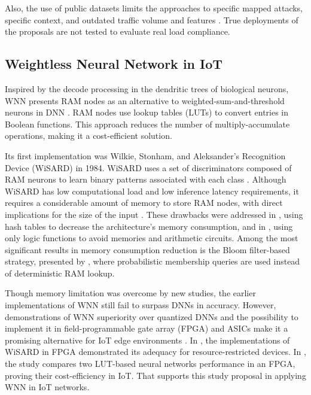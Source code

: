 Also, the use of public datasets limits the approaches to specific mapped attacks, specific context, and outdated traffic volume and features \cite{sharafaldin:2018, di:2021}. True deployments of the proposals are not tested to evaluate real load compliance. 

\subsection{Weightless Neural Network in IoT}
Inspired by the decode processing in the dendritic trees of biological neurons, WNN presents RAM nodes as an alternative to weighted-sum-and-threshold neurons in DNN \cite{aleksander:2009}. RAM nodes use lookup tables (LUTs) to convert entries in Boolean functions. This approach reduces the number of multiply-accumulate operations, making it a cost-efficient solution.

Its first implementation was Wilkie, Stonham, and Aleksander’s Recognition Device (WiSARD) in 1984. WiSARD uses a set of discriminators composed of RAM neurons to learn binary patterns associated with each class \cite{di:2020}. Although WiSARD has low computational load and low inference latency requirements, it requires a considerable amount of memory to store RAM nodes, with direct implications for the size of the input \cite{lello:2020}. These drawbacks were addressed in \cite{ferreira:2019}, using hash tables to decrease the architecture's memory consumption, and in \cite{miranda:2022}, using only logic functions to avoid memories and arithmetic circuits. Among the most significant results in memory consumption reduction is the Bloom filter-based strategy, presented by \cite{santiago:2020, susskind:2022}, where probabilistic membership queries are used instead of deterministic RAM lookup.

Though memory limitation was overcome by new studies, the earlier implementations of WNN still fail to surpass DNNs in accuracy. However, demonstrations of WNN superiority over quantized DNNs and the possibility to implement it in field-programmable gate array (FPGA) and ASICs make it a promising alternative for IoT edge environments \cite{susskind:2023}. In \cite{ferreira:2019, susskind:2022}, the implementations of WiSARD in FPGA demonstrated its adequacy for resource-restricted devices. In \cite{nag:2024}, the study compares two LUT-based neural networks performance in an FPGA, proving their cost-efficiency in IoT. That supports this study proposal in applying WNN in IoT networks.

